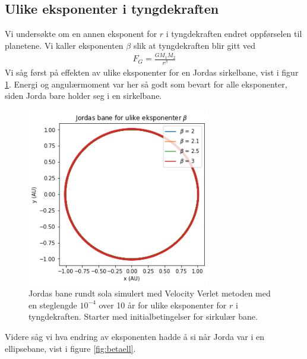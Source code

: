 \documentclass[reprint,english,notitlepage]{revtex4-1}
\begin{document}
\subsection{Ulike eksponenter i tyngdekraften}
	Vi undersøkte om en annen eksponent for $r$ i tyngdekraften endret oppførselen til planetene. Vi kaller eksponenten $\beta$ slik at tyngdekraften blir gitt ved
	\begin{equation}
	\begin{aligned}
	F_G = \frac{GM_1M_2}{r^\beta}
	\end{aligned}
	\end{equation}
	Vi såg først på effekten av ulike eksponenter for en Jordas sirkelbane, vist i figur \ref{fig:betacirc}. Energi og angulærmoment var her så godt som bevart for alle eksponenter, siden Jorda bare holder seg i en sirkelbane.

	\begin{figure}[H]
		\includegraphics[width=80mm]{../Code/Figures/betacirc.png}
		\caption{Jordas bane rundt sola simulert med Velocity Verlet metoden med en steglengde $10^{-4}$ over 10 år for ulike eksponenter for $r$ i tyngdekraften. Starter med initialbetingelser for sirkulær bane.}
		\label{fig:betacirc}
	\end{figure}

	Videre såg vi hva endring av eksponenten hadde å si når Jorda var i en ellipsebane, vist i figure \ref{fig:betaell}.
\end{document}
